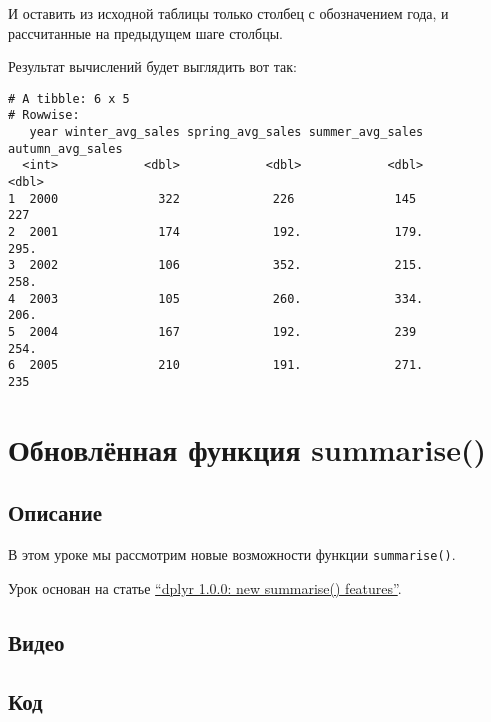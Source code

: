 \documentclass[
]{book}
\begin{document}
И оставить из исходной таблицы только столбец с обозначением года, и рассчитанные на предыдущем шаге столбцы.

Результат вычислений будет выглядить вот так:

\begin{verbatim}
# A tibble: 6 x 5
# Rowwise: 
   year winter_avg_sales spring_avg_sales summer_avg_sales autumn_avg_sales
  <int>            <dbl>            <dbl>            <dbl>            <dbl>
1  2000              322             226              145              227 
2  2001              174             192.             179.             295.
3  2002              106             352.             215.             258.
4  2003              105             260.             334.             206.
5  2004              167             192.             239              254.
6  2005              210             191.             271.             235 
\end{verbatim}

\hypertarget{ux43eux431ux43dux43eux432ux43bux451ux43dux43dux430ux44f-ux444ux443ux43dux43aux446ux438ux44f-summarise}{%
\chapter{Обновлённая функция summarise()}\label{ux43eux431ux43dux43eux432ux43bux451ux43dux43dux430ux44f-ux444ux443ux43dux43aux446ux438ux44f-summarise}}

\hypertarget{ux43eux43fux438ux441ux430ux43dux438ux435-3}{%
\section{Описание}\label{ux43eux43fux438ux441ux430ux43dux438ux435-3}}

В этом уроке мы рассмотрим новые возможности функции \texttt{summarise()}.

Урок основан на статье \href{https://www.tidyverse.org/blog/2020/03/dplyr-1-0-0-summarise/}{``dplyr 1.0.0: new summarise() features''}.

\hypertarget{ux432ux438ux434ux435ux43e-3}{%
\section{Видео}\label{ux432ux438ux434ux435ux43e-3}}

\hypertarget{ux43aux43eux434-3}{%
\section{Код}\label{ux43aux43eux434-3}}
\end{document}
